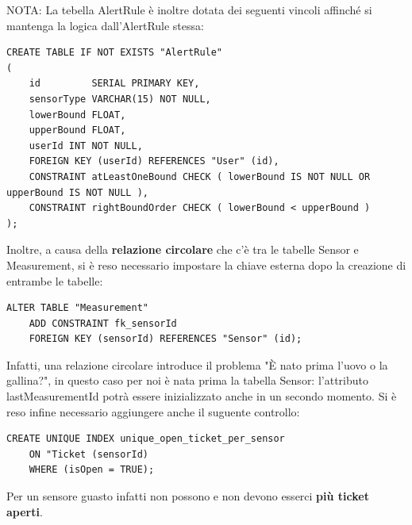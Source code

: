 \documentclass[a4paper, 11pt]{article}
\begin{document}
	NOTA: La tebella AlertRule è inoltre dotata dei seguenti vincoli affinché si mantenga la logica dall'AlertRule stessa:

	\begin{lstlisting}[style=stileSQL]
CREATE TABLE IF NOT EXISTS "AlertRule"
(
    id         SERIAL PRIMARY KEY,
    sensorType VARCHAR(15) NOT NULL,
    lowerBound FLOAT,
    upperBound FLOAT,
    userId INT NOT NULL,
    FOREIGN KEY (userId) REFERENCES "User" (id),
    CONSTRAINT atLeastOneBound CHECK ( lowerBound IS NOT NULL OR upperBound IS NOT NULL ),
    CONSTRAINT rightBoundOrder CHECK ( lowerBound < upperBound )
);
	\end{lstlisting}
	\newline
	Inoltre, a causa della \textbf{relazione circolare} che c'è tra le tabelle Sensor e Measurement, si è reso necessario impostare la chiave esterna dopo la creazione di entrambe le tabelle:
	\begin{lstlisting}[style = stileSQL]
    ALTER TABLE "Measurement"
    ADD CONSTRAINT fk_sensorId
    FOREIGN KEY (sensorId) REFERENCES "Sensor" (id);
	\end{lstlisting}
	Infatti, una relazione circolare introduce il problema "È nato prima l'uovo o la gallina?", in questo caso per noi è nata prima la tabella Sensor: l'attributo lastMeasurementId potrà essere inizializzato anche in un secondo momento.
	\newline
	Si è reso infine necessario aggiungere anche il suguente controllo:
	\begin{lstlisting}[style = stileSQL]
    CREATE UNIQUE INDEX unique_open_ticket_per_sensor
    ON "Ticket (sensorId)
    WHERE (isOpen = TRUE);
	\end{lstlisting}
	Per un sensore guasto infatti non possono e non devono esserci \textbf{più ticket aperti}.
\end{document}
